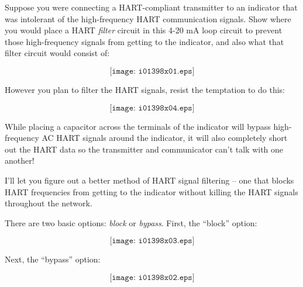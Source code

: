 

Suppose you were connecting a HART-compliant transmitter to an indicator that was intolerant of the high-frequency HART communication signals.  Show where you would place a HART {\it filter} circuit in this 4-20 mA loop circuit to prevent those high-frequency signals from getting to the indicator, and also what that filter circuit would consist of:

$$\texttt{[image: i01398x01.eps]}$$







However you plan to filter the HART signals, resist the temptation to do this:

$$\texttt{[image: i01398x04.eps]}$$

While placing a capacitor across the terminals of the indicator will bypass high-frequency AC HART signals around the indicator, it will also completely short out the HART data so the transmitter and communicator can't talk with one another!

I'll let you figure out a better method of HART signal filtering -- one that blocks HART frequencies from getting to the indicator without killing the HART signals throughout the network.







There are two basic options: {\it block} or {\it bypass}.  First, the ``block'' option:

$$\texttt{[image: i01398x03.eps]}$$

\vskip 10pt

\filbreak

Next, the ``bypass'' option:

$$\texttt{[image: i01398x02.eps]}$$




